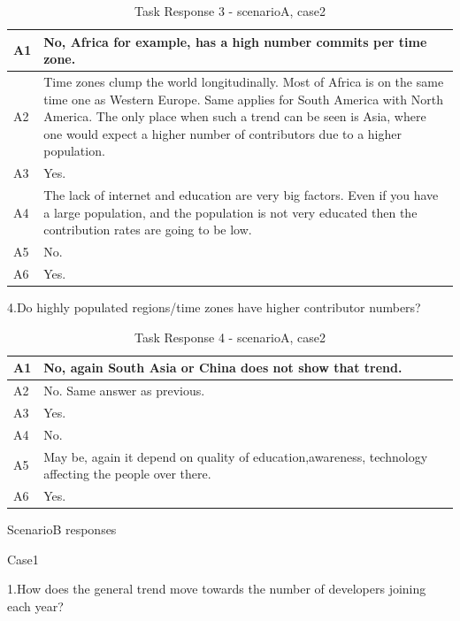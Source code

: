 \documentclass[seploa]{beavtex}
\begin{document}
\begin{appendices}
\begin{table}[H]
\begin{tabular}{ |p{2cm}|p{12cm}| }
 \hline
 A1 & No, Africa for example, has a high number commits per time zone.\\
 \hline
 A2 & Time zones clump the world longitudinally. Most of Africa is on the same time one as Western Europe. Same applies for South America with North America. The only place when such a trend can be seen is Asia, where one would expect a higher number of contributors due to a higher population.\\ \hline
 A3 & Yes.\\ \hline
 A4 & The lack of internet and education are very big factors. Even if you have a large population, and the population is not very educated then the contribution rates are going to be low.\\ \hline
 A5 & No.\\ \hline
 A6 & Yes.\\
 \hline
\end{tabular}
\caption{Task Response 3 - scenarioA, case2}
\label{tab:table13}
\end{table}

4.Do highly populated regions/time zones have higher contributor numbers?

\begin{table}[H]
\begin{tabular}{ |p{2cm}|p{12cm}| }
 \hline
 A1 & No, again South Asia or China does not show that trend.\\
 \hline
 A2 & No. Same answer as previous.\\ \hline
 A3 & Yes.\\ \hline
 A4 & No.\\ \hline
 A5 & May be, again it depend on quality of education,awareness, technology affecting the people over there.\\ \hline
 A6 & Yes.\\
 \hline
\end{tabular}
\caption{Task Response 4 - scenarioA, case2}
\label{tab:table14}
\end{table}

ScenarioB responses

Case1

1.How does the general trend move towards the number of developers joining each year?	


\end{appendices}
\end{document}
